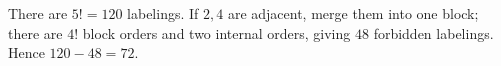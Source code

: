 There are $5!=120$ labelings. If $2,4$ are adjacent, merge them into one block; there are $4!$ block orders and two internal orders, giving $48$ forbidden labelings. Hence $120-48=\boxed{72}$.

